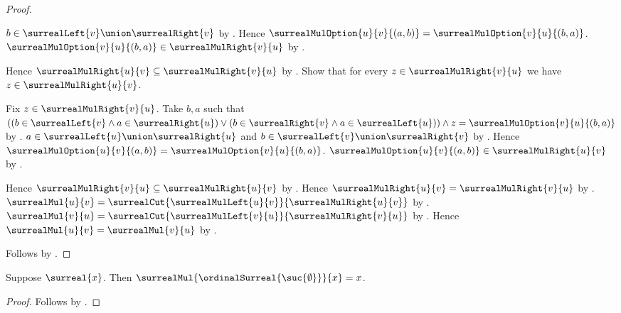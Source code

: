 \begin{proof}
\begin{subproof}
\begin{subproof}
                $b\in\surrealLeft{v}\union\surrealRight{v}$
                by .
            Hence
                $\surrealMulOption{u}{v}{(a,b)}
                    =\surrealMulOption{v}{u}{(b,a)}$.
            $\surrealMulOption{v}{u}{(b,a)}
                \in\surrealMulRight{v}{u}$
                by .
        \end{subproof}
        Hence $\surrealMulRight{u}{v}\subseteq\surrealMulRight{v}{u}$
            by .
        Show that for every $z\in\surrealMulRight{v}{u}$ we have
            $z\in\surrealMulRight{u}{v}$.
        \begin{subproof}
            Fix $z\in\surrealMulRight{v}{u}$.
            Take $b,a$ such that
                $((b\in\surrealLeft{v}\land a\in\surrealRight{u})
                  \lor(b\in\surrealRight{v}\land a\in\surrealLeft{u}))
                 \land z=\surrealMulOption{v}{u}{(b,a)}$
                by .
            $a\in\surrealLeft{u}\union\surrealRight{u}$ and
                $b\in\surrealLeft{v}\union\surrealRight{v}$
                by .
            Hence
                $\surrealMulOption{u}{v}{(a,b)}
                    =\surrealMulOption{v}{u}{(b,a)}$.
            $\surrealMulOption{u}{v}{(a,b)}
                \in\surrealMulRight{u}{v}$
                by .
        \end{subproof}
        Hence $\surrealMulRight{v}{u}\subseteq\surrealMulRight{u}{v}$
            by .
        Hence $\surrealMulRight{u}{v}=\surrealMulRight{v}{u}$
            by .
        $\surrealMul{u}{v}
            =\surrealCut{\surrealMulLeft{u}{v}}{\surrealMulRight{u}{v}}$
            by .
        $\surrealMul{v}{u}
            =\surrealCut{\surrealMulLeft{v}{u}}{\surrealMulRight{v}{u}}$
            by .
        Hence $\surrealMul{u}{v}=\surrealMul{v}{u}$ by \auto.
    \end{subproof}
    Follows by .
\end{proof}

\begin{corollary}\label{surreal_mul_one_left}
    Suppose $\surreal{x}$.
    Then $\surrealMul{\ordinalSurreal{\suc{\emptyset}}}{x}=x$.
\end{corollary}
\begin{proof}
    Follows by
        .
\end{proof}

